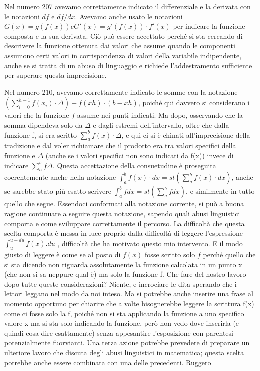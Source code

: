 Nel numero 207 avevamo correttamente indicato il differenziale e la derivata 
con le notazioni \(df\) e \(df / dx\). 
Avevamo anche usato le notazioni 
\(G(x) = g(f(x)) e G'(x) = g'(f(x))·f'(x)\)  
per indicare la funzione composta e la sua 
derivata. Ciò può essere accettato perché si sta cercando di descrivere la 
funzione ottenuta dai valori che assume quando le componenti assumono certi 
valori in corrispondenza di valori della variabile indipendente, anche se si 
tratta di un abuso di linguaggio e richiede l'addestramento sufficiente per 
superare questa imprecisione.

Nel numero 210, avevamo correttamente indicato le somme con la notazione 
\((\sum_{i=0}^{h-1} f(x_i)\cdot\Delta) + f(xh)\cdot(b-xh)\), 
poiché qui davvero si considerano i 
valori che la funzione \(f\) assume nei punti indicati. Ma dopo, osservando 
che 
la somma dipendeva solo da \(\Delta\) e dagli estremi dell'intervallo, oltre 
che 
dalla funzione f, si era scritto \(\sum_a^b f(x) \cdot \Delta\), e qui ci si 
è chinati 
all'imprecisione della tradizione e dal voler richiamare che il prodotto era 
tra valori specifici della funzione e \(\Delta\) (anche se i valori specifici 
non sono indicati da f(x)) invece di indicare \(\sum_a^b f\Delta\). 
Questa accettazione 
della consuetudine è proseguita coerentemente anche nella notazione 
\(\int_a^b f(x) \cdot dx = st (\sum_a^b f(x) \cdot dx)\), anche se sarebbe 
stato più esatto scrivere 
\(\int_a^b fdx = st(\sum_a^b fdx)\), e similmente in tutto quello che segue. 
Essendoci conformati alla notazione corrente, si può a buona ragione 
continuare a seguire questa notazione, sapendo quali abusi linguistici 
comporta e come sviluppare correttamente il percorso.
La difficoltà che questa scelta comporta è messa in luce proprio dalla 
difficoltà di leggere l'espressione \(\int_u^{u+du} f(x).du\) , difficoltà 
che ha motivato questo mio intervento. 
E il modo giusto di leggere è come se al 
posto di \(f(x)\) fosse scritto solo \(f\) perché quello che si sta dicendo non 
riguarda assolutamente la funzione calcolata in  un punto x (che non si sa 
neppure qual è) ma solo la funzione f. 
Che fare del nostro lavoro dopo tutte queste considerazioni? Niente, e 
incrociare le dita sperando che i lettori leggano nel modo da noi inteso. Ma 
si potrebbe anche inserire una frase al momento opportuno per chiarire che a 
volte bisognerebbe leggere la scrittura f(x) come ci fosse solo la f, poiché 
non si sta applicando la funzione a uno specifico valore x ma si sta solo 
indicando la funzione, però non vedo dove inserirla (e quindi cosa dire 
esattamente) senza appesantire l'esposizione con parentesi potenzialmente 
fuorvianti. Una terza azione potrebbe prevedere di preparare un ulteriore 
lavoro che discuta degli abusi linguistici in matematica; questa scelta 
potrebbe anche essere combinata con una delle precedenti.
  Ruggero
